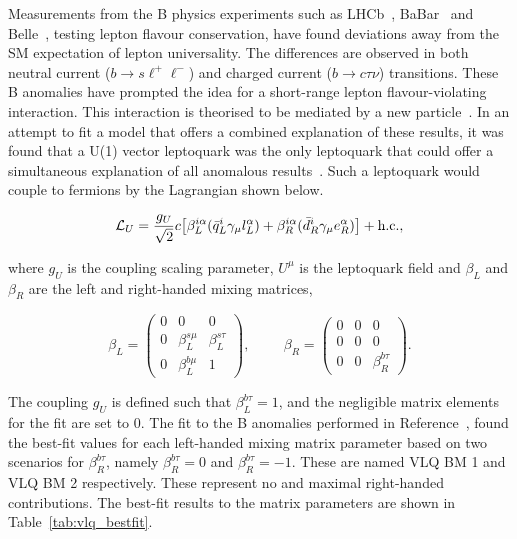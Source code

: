 Measurements from the B physics experiments such as LHCb~\cite{LHCb:2021trn,LHCb:2015gmp,LHCb:2017rln,LHCb:2017smo}, BaBar~\cite{Kowalewski:2013mna,BaBar:2013mob} and Belle~\cite{Belle:2015qfa,Belle:2016dyj}, testing lepton flavour conservation, have found deviations away from the \ac{SM} expectation of lepton universality.
The differences are observed in both neutral current ($b\rightarrow s\ell^{+}\ell^{-}$) and charged current ($b\rightarrow c\tau\nu$) transitions.
These B anomalies have prompted the idea for a short-range lepton flavour-violating interaction.
This interaction is theorised to be mediated by a new  particle~\cite{Diaz:2017lit,Schmaltz:2018nls}.
In an attempt to fit a model that offers a combined explanation of these results, it was found that a U(1) vector leptoquark was the only leptoquark that could offer a simultaneous explanation of all anomalous results~\cite{Cornella:2021sby}. 
Such a leptoquark would couple to fermions by the Lagrangian shown below.

\begin{equation}
\mathcal{L}_{U} = \frac{g_{U}}{\sqrt{2}} c \big[ \beta_{L}^{i\alpha}( \bar{q}_{L}^{i} \gamma_{\mu} l_{L}^{\alpha}) + \beta_{R}^{i\alpha}( \bar{d}_{R}^{i} \gamma_{\mu} e_{R}^{\alpha}) \big] + \text{h.c.},
\end{equation}

where $g_{U}$ is the coupling scaling parameter, $U^{\mu}$ is the leptoquark field and $\beta_{L}$ and $\beta_{R}$ are the left and right-handed mixing matrices,

\begin{equation}
\beta_{L} = 
\begin{pmatrix}
0 & 0 & 0 \\
0 & \beta_{L}^{s\mu} & \beta_{L}^{s\tau} \\
0 & \beta_{L}^{b\mu} & 1
\end{pmatrix},
\hspace{1cm}
\beta_{R} = 
\begin{pmatrix}
0 & 0 & 0 \\
0 & 0 & 0 \\
0 & 0 & \beta_{R}^{b\tau}
\end{pmatrix}.
\end{equation}

The coupling $g_{U}$ is defined such that $\beta_{L}^{b\tau}=1$, and the negligible matrix elements for the fit are set to 0.
The fit to the B anomalies performed in Reference~\cite{Cornella:2021sby}, found the best-fit values for each left-handed mixing matrix parameter based on two scenarios for $\beta^{b\tau}_{R}$, namely $\beta^{b\tau}_{R} = 0$ and $\beta^{b\tau}_{R} = -1$.
These are named VLQ BM 1 and VLQ BM 2 respectively.
These represent no and maximal right-handed contributions. 
The best-fit results to the matrix parameters are shown in Table~\ref{tab:vlq_bestfit}.

